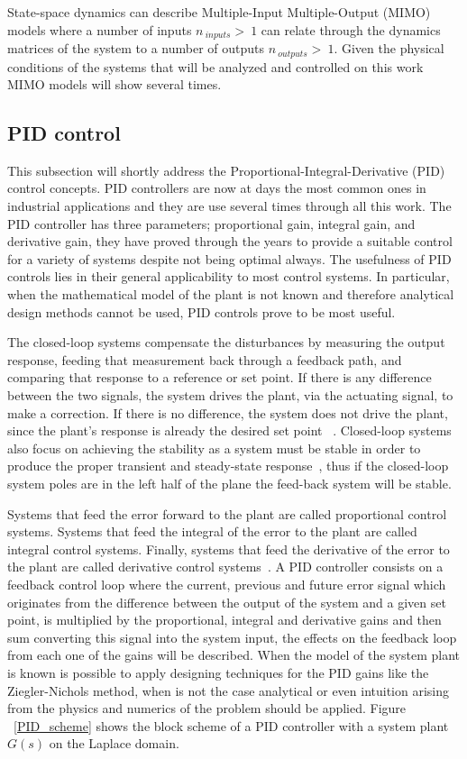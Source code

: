 State-space dynamics can describe Multiple-Input Multiple-Output (MIMO) models where a number of inputs $n_{~inputs}>~1$ can relate through the dynamics  matrices of the system to a number of outputs $n_{~outputs}>~1$. Given the physical conditions of the systems that will be analyzed and controlled on this work MIMO models will show several times.


\subsection{PID control}

This subsection will shortly address the Proportional-Integral-Derivative (PID) control  concepts. PID controllers are now at days the most common ones in industrial applications and they are use several times through all this work. The PID controller has three parameters; proportional gain, integral gain, and derivative gain, they have proved through the years to provide a suitable control for a variety of systems despite not being optimal always. The usefulness of PID controls lies in their general applicability to most control systems. In particular, when the mathematical model of the plant is not known and therefore analytical design methods cannot be used, PID controls prove to be most useful.  
\smallskip

The closed-loop systems compensate the disturbances by measuring the output
response, feeding that measurement back through a feedback path, and comparing
that response to a reference or set point. If there is any difference between
the two signals, the system drives the plant, via the actuating signal, to make a
correction. If there is no difference, the system does not drive the plant, since the
plant’s response is already the desired set point ~\cite[Chapter ~1]{Nise}. Closed-loop systems also focus on achieving the stability as a system must be stable in order to produce the proper transient and steady-state response~\cite[Chapter ~3]{Nise}, thus if the closed-loop system poles are in the left half of the plane the feed-back system will be stable.
\smallskip

Systems that feed the error forward to the plant are called proportional control systems. Systems that feed the integral of the error to the plant are called integral control systems. Finally, systems that feed the derivative of the error to the plant are called derivative control systems~\cite[Chapter ~9]{Nise}. A PID controller consists on a feedback control loop where the current, previous and future error signal which originates from the difference between the output of the system and a given set point, is multiplied by the proportional, integral and derivative gains  and then sum converting this signal into the system input, the effects on the feedback loop from each one of the gains will be described. When the model of the system plant is known is possible to apply designing techniques for the PID gains like the Ziegler-Nichols method, when is not the case analytical or even intuition arising from the physics and numerics of the problem should be applied. Figure ~\ref{PID_scheme} shows the block scheme of a PID controller with a system plant $G(s)$ on the Laplace domain.

